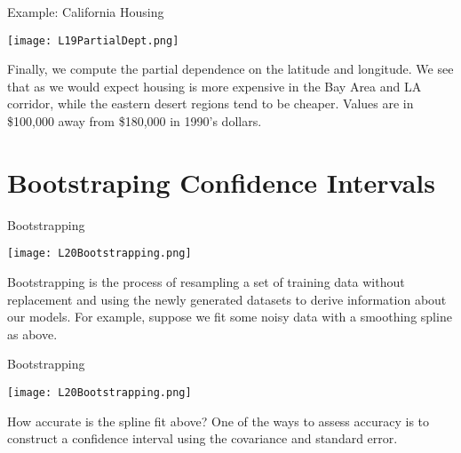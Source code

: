 \documentclass[10pt, table, dvipsnames,xcdraw, handout]{beamer}
\begin{document}
 \begin{frame}[fragile]{Example: California Housing}
   \begin{minipage}[t][0.4\textheight][t]{\textwidth}
	\centering \texttt{[image: L19PartialDept.png]}
  \end{minipage}
  \vfill
\begin{minipage}[t][0.4\textheight][t]{\textwidth}
Finally, we compute the partial dependence on the latitude and longitude. We see that as we would expect housing is more expensive in the Bay Area and LA corridor, while the eastern desert regions tend to be cheaper. Values are in \$100,000 away from \$180,000 in 1990's dollars. 
\end{minipage}
\end{frame}




\section{Bootstraping Confidence Intervals}

\begin{frame}[fragile]{Bootstrapping}
  \begin{minipage}[t][0.5\textheight][t]{\textwidth}
	\centering \texttt{[image: L20Bootstrapping.png]} 
  \end{minipage}
  \vfill
\begin{minipage}[t][0.5\textheight][t]{\textwidth}
Bootstrapping is the process of resampling a set of training data without replacement and using the newly generated datasets to derive information about our models. For example, suppose we fit some noisy data with a smoothing spline as above. 
\end{minipage}
\end{frame}



\begin{frame}[fragile]{Bootstrapping}
  \begin{minipage}[t][0.5\textheight][t]{\textwidth}
	\centering \texttt{[image: L20Bootstrapping.png]} 
  \end{minipage}
  \vfill
\begin{minipage}[t][0.5\textheight][t]{\textwidth}
How accurate is the spline fit above? One of the ways to assess accuracy is to construct a confidence interval using the covariance and standard error. 
\end{minipage}
\end{frame}
\end{document}
